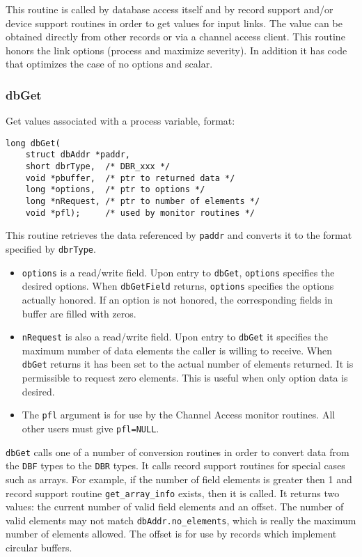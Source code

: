 This routine is called by database access itself and by record support and/or device support routines in order to get values 
for input links. The value can be obtained directly from other records or via a channel access client. This routine honors 
the link options (process and maximize severity). In addition it has code that optimizes the case of no options and scalar.

\subsubsection{dbGet}

Get values associated with a process variable, format:

\begin{verbatim}
long dbGet(
    struct dbAddr *paddr,
    short dbrType,  /* DBR_xxx */
    void *pbuffer,  /* ptr to returned data */
    long *options,  /* ptr to options */
    long *nRequest, /* ptr to number of elements */
    void *pfl);     /* used by monitor routines */
\end{verbatim}

This routine retrieves the data referenced by \verb|paddr| and converts it to the format specified by \verb|dbrType|. 

\begin{itemize}
\item \verb|options| is a read/write field. Upon entry to \verb|dbGet|, \verb|options| specifies the desired options. When 
\verb|dbGetField| returns, \verb|options| specifies the options actually honored. If an option is not honored, the 
corresponding fields in buffer are filled with zeros.

\item \verb|nRequest| is also a read/write field. Upon entry to \verb|dbGet| it specifies the maximum number of data elements the 
caller is willing to receive. When \verb|dbGet| returns it has been set to the actual number of elements returned. It is 
permissible to request zero elements. This is useful when only option data is desired.

\item The \verb|pfl| argument is for use by the Channel Access monitor routines. All other users must give \verb|pfl=NULL|.

\end{itemize}

\verb|dbGet| calls one of a number of conversion routines in order to convert data from the \verb|DBF| types to the \verb|DBR| types. It calls 
record support routines for special cases such as arrays. For example, if the number of field elements is greater then 1 and 
record support routine \verb|get_array_info| exists, then it is called. It returns two values: the current number of valid field 
elements and an offset. The number of valid elements may not match \verb|dbAddr.no_elements|, which is really the 
maximum number of elements allowed. The offset is for use by records which implement circular buffers.

